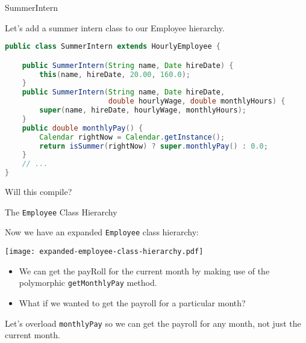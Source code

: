 \documentclass{beamer}
\begin{document}
\begin{frame}[fragile]{SummerIntern}


Let's add a summer intern class to our Employee hierarchy.
\begin{lstlisting}[language=Java]
public class SummerIntern extends HourlyEmployee {

    public SummerIntern(String name, Date hireDate) {
        this(name, hireDate, 20.00, 160.0);
    }
    public SummerIntern(String name, Date hireDate, 
                        double hourlyWage, double monthlyHours) {
        super(name, hireDate, hourlyWage, monthlyHours);
    }
    public double monthlyPay() {
        Calendar rightNow = Calendar.getInstance();
        return isSummer(rightNow) ? super.monthlyPay() : 0.0;
    }
    // ...
}
\end{lstlisting}

Will this compile?

\end{frame}


\begin{frame}[fragile]{The {\tt Employee} Class Hierarchy}


Now we have an expanded {\tt Employee} class hierarchy:
\vspace{-.1in}
\begin{center}
\texttt{[image: expanded-employee-class-hierarchy.pdf]}
\end{center}

\begin{itemize}
\item We can get the payRoll for the current month by making use of the polymorphic {\tt getMonthlyPay} method.
\item What if we wanted to get the payroll for a particular month?
\end{itemize}

Let's overload {\tt monthlyPay} so we can get the payroll for any month, not just the current month.

\end{frame}
\end{document}
